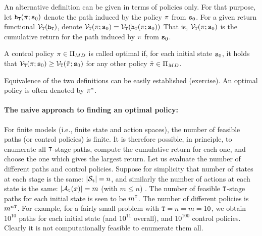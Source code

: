An alternative definition can be given in terms of policies only.
For that purpose, let ${{\tt h}_{\tt T}}(\pi ;{{\tt s}_0})$
denote the path induced by the policy $\pi $ from ${{\tt s}_0}$.
For a given return functional
${\mathcal{V}_{\tt T}}({{\tt h}_{\tt T}})$, denote
${\mathcal{V}_{\tt T}}(\pi ;{{\tt s}_0}) =
{\mathcal{V}_{\tt T}}({{\tt h}_{\tt T}}(\pi ;{{\tt s}_0}))$ That
is, ${\mathcal{V}_{\tt T}}(\pi ;{{\tt s}_0})$ is the cumulative
return for the path induced by $\pi $ from ${{\tt s}_0}$.

\begin{definition}
A control policy $\pi \in\Pi_{MD}$ is called optimal if, for
each initial state ${{\tt s}_0}$, it holds that
${\mathcal{V}_{\tt T}}(\pi ;{{\tt s}_0}) \ge
{\mathcal{V}_{\tt T}}(\tilde {\pi} ;{{\tt s}_0})$ for any other policy
$\tilde {\pi} \in\Pi_{MD}$.
\end{definition}

Equivalence of the two definitions can be easily established
(exercise). An optimal policy is often denoted by ${\pi ^*}$.

\vspace{10pt} 


\normalsize
\paragraph{The naive approach to finding an optimal policy:}
For finite models (i.e., finite state and action spaces), the number
of feasible paths (or control policies) is finite.  It is therefore
possible, in principle, to enumerate all ${\tt T}$-stage paths,
compute the cumulative return for each one, and choose the one which
gives the largest return. Let us evaluate the number of different
paths and control policies. Suppose for simplicity that number of
states at each stage is the same: $|{\mathcal{S}_{{\tt t}}}| = n$, and
similarly the number of actions at each state is the same:
$|{\mathcal{A}_{{\tt t}}}(x)| = m$ (with $m \le n$) . The number of
feasible ${\tt T}$-stage paths for each initial state is seen to
be ${m^{\tt T}}$. The number of different policies is
${m^{n{\tt T}}}$. For example, for a fairly small problem with
${\tt T} = n = m = 10$, we obtain ${10^{10}}$ paths for each
initial state (and ${10^{11}}$ overall), and ${10^{100}}$ control
policies. Clearly it is not computationally feasible to enumerate
them all.

